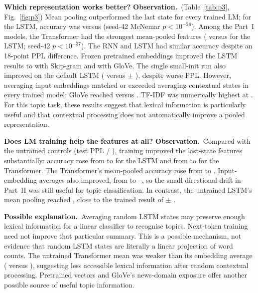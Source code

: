 \documentclass[10pt]{article}
\newcommand{\obs}{\textbf{Observation.}~}
\newcommand{\hyp}{\par\textbf{Possible explanation.}~}
\begin{document}
\textbf{Which representation works better?} \obs (Table~\ref{tab:p3}, Fig.~\ref{fig:p3}) Mean pooling outperformed
the last state for every trained LM; for the LSTM, accuracy was \accLstmMean{} versus \accLstmLast{} (seed-42
McNemar $p<10^{-28}$). Among the Part~I models, the Transformer had the strongest mean-pooled features
(\accTrMean{} versus \accLstmMean{} for the LSTM; seed-42 $p<10^{-37}$). The RNN and LSTM had similar accuracy
despite an 18-point PPL difference. Frozen pretrained embeddings improved the LSTM results to \accSgMean{} with
Skip-gram and \accGloveMean{} with GloVe. The single small-init run also improved on the default LSTM
(\accSmallMean{} versus \accLstmMean{} $\pm$ \sdLstmMean), despite worse PPL. However, averaging input embeddings
matched or exceeded averaging contextual states in every trained model; GloVe reached \accGloveEmb{} versus
\accGloveMean. TF-IDF was numerically highest at \bowAcc. For this topic task, these results suggest that lexical
information is particularly useful and that contextual processing does not automatically improve a pooled
representation.

\textbf{Does LM training help the features at all?} \obs Compared with the untrained controls (test PPL
\pplUnLstm{} / \pplUnTr), training improved the last-state features substantially: accuracy rose from
\accUnLstmLast{} to \accLstmLast{} for the LSTM and from \accUnTrLast{} to \accTrLast{} for the Transformer. The
Transformer's mean-pooled accuracy rose from \accUnTrMean{} to \accTrMean. Input-embedding averages also improved,
from \accUnLstmEmb{} to \accLstmEmb--\accTrEmb, so the small directional drift in Part~II was still useful for topic
classification. In contrast, the untrained LSTM's mean pooling reached \accUnLstmMean, close to the trained result
of \accLstmMean{} $\pm$ \sdLstmMean. \hyp Averaging random LSTM states may preserve enough lexical information for a
linear classifier to recognise topics. Next-token training need not improve that particular summary. This is a
possible mechanism, not evidence that random LSTM states are literally a linear projection of word counts. The
untrained Transformer mean was weaker than its embedding average (\accUnTrMean{} versus \accUnTrEmb), suggesting
less accessible lexical information after random contextual processing. Pretrained vectors and GloVe's news-domain
exposure offer another possible source of useful topic information.
\end{document}
